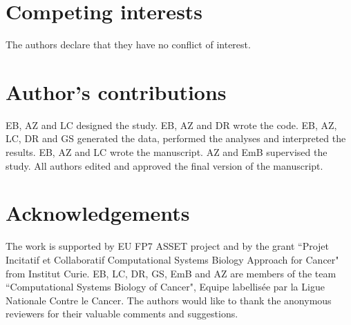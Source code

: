 \documentclass[10pt]{bmc_article}
\newenvironment{bmcformat}{\baselineskip20pt\sloppy\setboolean{publ}{false}}{\baselineskip20pt\sloppy}
\begin{document}
\begin{bmcformat}
\bigskip

\section*{Competing interests}
The authors declare that they have no conflict of interest.

\section*{Author's contributions}
EB, AZ and LC designed the study. EB, AZ and DR wrote the code. EB, AZ, LC, DR
and GS generated the data, performed the analyses and interpreted the results.
EB, AZ and LC wrote the manuscript. AZ and EmB supervised the study. All authors
edited and approved the final version of the manuscript.

\section*{Acknowledgements}
The work is supported by EU FP7 ASSET project and by the grant ``Projet Incitatif et Collaboratif Computational Systems Biology Approach for Cancer" from Institut Curie.  
EB, LC, DR, GS, EmB and AZ are members of the team ``Computational Systems Biology of
Cancer", Equipe labellisée par la Ligue Nationale Contre le Cancer. The authors would like to thank the anonymous reviewers for their valuable comments and suggestions. 




\end{bmcformat}
\end{document}
